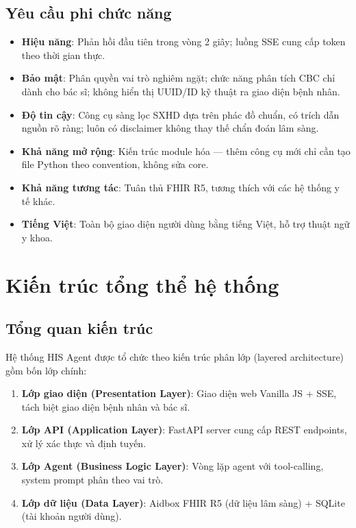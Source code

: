 \documentclass[oneside, a4paper]{book}
\theoremstyle{plain}
\theoremstyle{plain}
\theoremstyle{definition}
\theoremstyle{remark}
\begin{document}
\subsection{Yêu cầu phi chức năng}

\begin{itemize}
  \item \textbf{Hiệu năng}: Phản hồi đầu tiên trong vòng 2 giây; luồng SSE cung cấp token theo thời gian thực.
  \item \textbf{Bảo mật}: Phân quyền vai trò nghiêm ngặt; chức năng phân tích CBC chỉ dành cho bác sĩ; không hiển thị UUID/ID kỹ thuật ra giao diện bệnh nhân.
  \item \textbf{Độ tin cậy}: Công cụ sàng lọc SXHD dựa trên phác đồ chuẩn, có trích dẫn nguồn rõ ràng; luôn có disclaimer không thay thế chẩn đoán lâm sàng.
  \item \textbf{Khả năng mở rộng}: Kiến trúc module hóa --- thêm công cụ mới chỉ cần tạo file Python theo convention, không sửa core.
  \item \textbf{Khả năng tương tác}: Tuân thủ FHIR R5, tương thích với các hệ thống y tế khác.
  \item \textbf{Tiếng Việt}: Toàn bộ giao diện người dùng bằng tiếng Việt, hỗ trợ thuật ngữ y khoa.
\end{itemize}

\section{Kiến trúc tổng thể hệ thống}

\subsection{Tổng quan kiến trúc}

Hệ thống HIS Agent được tổ chức theo kiến trúc phân lớp (layered architecture) gồm bốn lớp chính:

\begin{enumerate}
  \item \textbf{Lớp giao diện (Presentation Layer)}: Giao diện web Vanilla JS + SSE, tách biệt giao diện bệnh nhân và bác sĩ.
  \item \textbf{Lớp API (Application Layer)}: FastAPI server cung cấp REST endpoints, xử lý xác thực và định tuyến.
  \item \textbf{Lớp Agent (Business Logic Layer)}: Vòng lặp agent với tool-calling, system prompt phân theo vai trò.
  \item \textbf{Lớp dữ liệu (Data Layer)}: Aidbox FHIR R5 (dữ liệu lâm sàng) + SQLite (tài khoản người dùng).
\end{enumerate}
\end{document}
